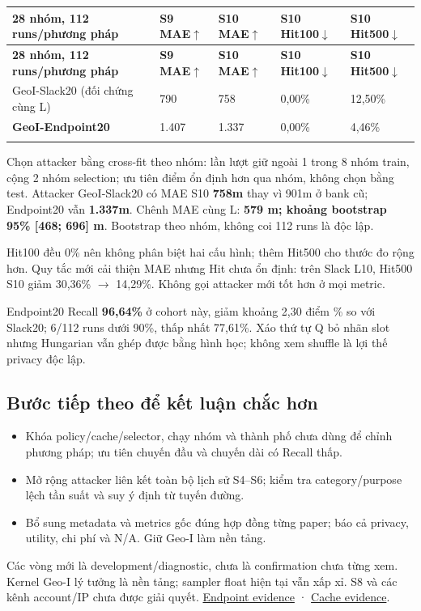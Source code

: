\documentclass[11pt,a4paper]{article}
\begin{document}
\begingroup\small
\begin{longtable}{@{}P{5.515cm}P{2.605cm}P{2.605cm}P{2.758cm}P{2.758cm}@{}}
\toprule
\textbf{28 nhóm, 112 runs/phương pháp} & \textbf{S9 MAE$\uparrow$} & \textbf{S10 MAE$\uparrow$} & \textbf{S10 Hit100$\downarrow$} & \textbf{S10 Hit500$\downarrow$}\\\midrule
\endfirsthead
\toprule
\textbf{28 nhóm, 112 runs/phương pháp} & \textbf{S9 MAE$\uparrow$} & \textbf{S10 MAE$\uparrow$} & \textbf{S10 Hit100$\downarrow$} & \textbf{S10 Hit500$\downarrow$}\\\midrule
\endhead\bottomrule\endfoot
GeoI-Slack20 (đối chứng cùng L) & 790 & 758 & 0,00\% & 12,50\%\\
\addlinespace[2pt]
\textbf{GeoI-Endpoint20} & 1.407 & 1.337 & 0,00\% & 4,46\%\\
\addlinespace[2pt]
\end{longtable}
\endgroup
Chọn attacker bằng cross-fit theo nhóm: lần lượt giữ ngoài 1 trong 8 nhóm train, cộng 2 nhóm selection; ưu tiên điểm ổn định hơn qua nhóm, không chọn bằng test. Attacker GeoI-Slack20 có MAE S10 \textbf{758m} thay vì 901m ở bank cũ; Endpoint20 vẫn \textbf{1.337m}. Chênh MAE cùng L: \textbf{579 m; khoảng bootstrap 95\% [468; 696] m}. Bootstrap theo nhóm, không coi 112 runs là độc lập.

Hit100 đều 0\% nên không phân biệt hai cấu hình; thêm Hit500 cho thước đo rộng hơn. Quy tắc mới cải thiện MAE nhưng Hit chưa ổn định: trên Slack L10, Hit500 S10 giảm 30,36\% $\rightarrow$ 14,29\%. Không gọi attacker mới tốt hơn ở mọi metric.

Endpoint20 Recall \textbf{96,64\%} ở cohort này, giảm khoảng 2,30 điểm \% so với Slack20; 6/112 runs dưới 90\%, thấp nhất 77,61\%. Xáo thứ tự Q bỏ nhãn slot nhưng Hungarian vẫn ghép được bằng hình học; không xem shuffle là lợi thế privacy độc lập.

\subsection*{Bước tiếp theo để kết luận chắc hơn}
\begin{itemize}
\item Khóa policy/cache/selector, chạy nhóm và thành phố chưa dùng để chỉnh phương pháp; ưu tiên chuyến đầu và chuyến dài có Recall thấp.
\item Mở rộng attacker liên kết toàn bộ lịch sử S4–S6; kiểm tra category/purpose lệch tần suất và suy ý định từ tuyến đường.
\item Bổ sung metadata và metrics gốc đúng hợp đồng từng paper; báo cả privacy, utility, chi phí và N/A. Giữ Geo-I làm nền tảng.
\end{itemize}
Các vòng mới là development/diagnostic, chưa là confirmation chưa từng xem. Kernel Geo-I lý tưởng là nền tảng; sampler float hiện tại vẫn xấp xỉ. S8 và các kênh account/IP chưa được giải quyết. \href{../../../artifacts/benchmarks/endpoint\_robust\_selection\_20261006/readout.json}{Endpoint evidence} · \href{../../../artifacts/benchmarks/native\_versioned\_static\_20261006\_v1/results.json}{Cache evidence}.
\end{document}
